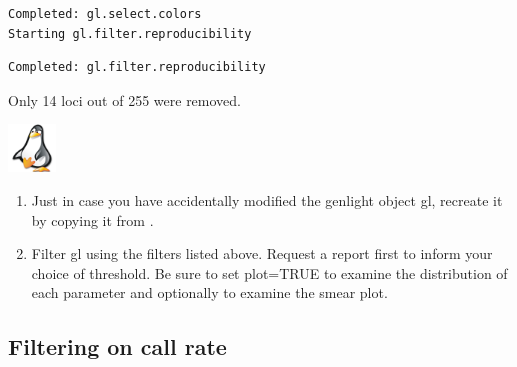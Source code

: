 \documentclass[
  letterpaper,
  DIV=11,
  numbers=noendperiod]{scrreprt}
\let\textttOrig\texttt
\renewcommand{\texttt}[1]{\textttOrig{\color{blue}{#1}}}
\begin{document}
\texttt{[image: basicfiltering\_files/figure-pdf/unnamed-chunk-5-1.pdf]}

\begin{verbatim}
Completed: gl.select.colors 
Starting gl.filter.reproducibility 
\end{verbatim}

\texttt{[image: basicfiltering\_files/figure-pdf/unnamed-chunk-5-2.pdf]}

\begin{verbatim}
Completed: gl.filter.reproducibility 
\end{verbatim}

Only 14 loci out of 255 were removed.

\begin{tcolorbox}[enhanced jigsaw, coltitle=black, colframe=quarto-callout-note-color-frame, colbacktitle=quarto-callout-note-color!10!white, breakable, bottomtitle=1mm, rightrule=.15mm, opacitybacktitle=0.6, left=2mm, arc=.35mm, opacityback=0, leftrule=.75mm, toptitle=1mm, titlerule=0mm, title=\textcolor{quarto-callout-note-color}{\faInfo}\hspace{0.5em}{Exercise}, bottomrule=.15mm, toprule=.15mm, colback=white]

\includegraphics[width=0.5in,height=0.5in]{images/task.png}

\begin{enumerate}
\def\labelenumi{\arabic{enumi}.}
\item
  Just in case you have accidentally modified the genlight object gl,
  recreate it by copying it from \texttt{testset.gl}.

  \texttt{gl\ \textless{}-\ testset.gl}
\item
  Filter gl using the filters listed above. Request a report first to
  inform your choice of threshold. Be sure to set plot=TRUE to examine
  the distribution of each parameter and optionally
  \texttt{smearplot=TRUE} to examine the smear plot.
\end{enumerate}

\end{tcolorbox}

\hypertarget{filtering-on-call-rate}{%
\subsection*{Filtering on call rate}\label{filtering-on-call-rate}}
\end{document}

